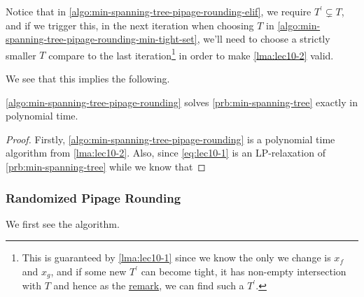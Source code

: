 \begin{note}
	Notice that in \autoref{algo:min-spanning-tree-pipage-rounding-elif}, we require \(T^\prime \subsetneq T\), and if we trigger this, in the next iteration when choosing \(T\) in \autoref{algo:min-spanning-tree-pipage-rounding-min-tight-set}, we'll need to choose a strictly smaller \(T\) compare to the last iteration\footnote{This is guaranteed by \autoref{lma:lec10-1} since we know the only we change is \(x_f\) and \(x_g\), and if some new \(T^\prime \) can become tight, it has non-empty intersection with \(T\) and hence as the \hyperref[rmk:lec10-1]{remark}, we can find such a \(T^\prime \).} in order to make \autoref{lma:lec10-2} valid.
\end{note}

We see that this implies the following.

\begin{theorem}
	\autoref{algo:min-spanning-tree-pipage-rounding} solves \autoref{prb:min-spanning-tree} exactly in polynomial time.
\end{theorem}
\begin{proof}
	Firstly, \autoref{algo:min-spanning-tree-pipage-rounding} is a polynomial time algorithm from \autoref{lma:lec10-2}. Also, since \autoref{eq:lec10-1} is an LP-relaxation of \autoref{prb:min-spanning-tree} while we know that
\end{proof}

\subsubsection{Randomized Pipage Rounding}
We first see the algorithm.

